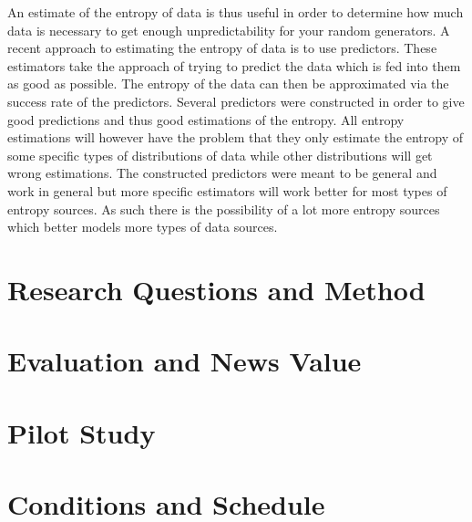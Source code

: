 \documentclass[a4paper,11pt]{report}
\begin{document}
\noindent
An estimate of the entropy of data is thus useful in order to determine
how much data is necessary to get enough unpredictability for your random
generators. A recent approach to estimating the entropy of data is to use 
predictors. These estimators take the approach of trying to predict the data
which is fed into them as good as possible. The entropy of the data can then
be approximated via the success rate of the predictors. Several predictors were
constructed in order to give good predictions and thus good estimations of the 
entropy. All entropy estimations will however have the problem that they only
estimate the entropy of some specific types of distributions of data while 
other distributions will get wrong estimations. The constructed predictors were 
meant to be general and work in general but more specific estimators will work
better for most types of entropy sources. As such there is the possibility of
a lot more entropy sources which better models more types of data sources.

\section*{Research Questions and Method}
\section*{Evaluation and News Value}
\section*{Pilot Study}

\section*{Conditions and Schedule}
\end{document}
